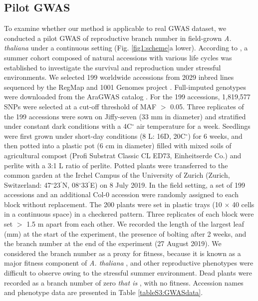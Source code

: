 \documentclass[12pt,]{article}
\begin{document}
\subsection{Pilot GWAS}
To examine whether our method is applicable to real GWAS dataset, we conducted a pilot GWAS of reproductive branch number in  field-grown \textit{A. thaliana} under a continuous setting (Fig. \ref{fig1:scheme}a lower). According to \cite{sato2019plant}, a summer cohort composed of natural accessions with various life cycles was established to investigate the survival and reproduction under stressful environments. We selected 199 worldwide accessions from 2029 inbred lines sequenced by the RegMap \citep{horton_genome-wide_2012} and 1001 Genomes project \citep{alonso-blanco_1135_2016}. Full-imputed genotypes were downloaded from the AraGWAS catalog \citep{togninalli_aragwas_2018}. For the 199 accessions, 1,819,577 SNPs were selected at a cut-off threshold of MAF $>$ 0.05. Three replicates of the 199 accessions were sown on Jiffy-seven (33 mm in diameter) and stratified under constant dark conditions with a 4C$^{\circ}$ air temperature for a week. Seedlings were first grown under short-day conditions (8 L: 16D, 20C$^{\circ}$) for 6 weeks, and then potted into a plastic pot (6 cm in diameter) filled with mixed soils of agricultural compost (Profi Substrat Classic CL ED73, Einheitserde Co.) and perlite with a 3:1 L ratio of perlite. Potted plants were transferred to the common garden at the Irchel Campus of the University of Zurich (Zurich, Switzerland: 47$^\circ$23$^\prime$N, 08$^\circ$33$^\prime$E) on 8 July 2019. In the field setting, a set of 199 accessions and an additional Col-0 accession were randomly assigned to each block without replacement. The 200 plants were set in plastic trays (10 $\times$ 40 cells in a continuous space) in a checkered pattern. Three replicates of each block were set $>$ 1.5 m apart from each other. We recorded the length of the largest leaf (mm) at the start of the experiment, the presence of bolting after 2 weeks, and the branch number at the end of the experiment (27 August 2019). We considered the branch number as a proxy for fitness, because it is known as a major fitness component of \textit{A. thaliana} \citep{chong2018note}, and other reproductive phenotypes were difficult to observe owing to the stressful summer environment. Dead plants were recorded as a branch number of zero \textit{ that is }, with no fitness. Accession names and phenotype data are presented in Table \ref{tableS3:GWASdata}.
\end{document}
